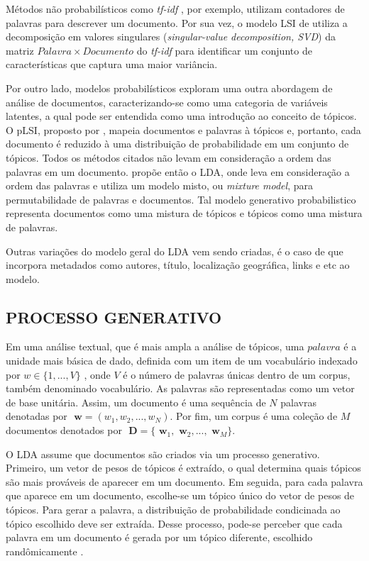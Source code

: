 \documentclass[12pt,a4paper]{article}
\begin{document}
Métodos não probabilísticos como \textit{tf-idf} \cite{salton1983introduction}, por exemplo, utilizam contadores de palavras para descrever um documento.
 Por sua vez, o modelo LSI de  utiliza a decomposição em valores singulares (\textit{singular-value decomposition, SVD}) da
 matriz $Palavra \times Documento$ do \textit{tf-idf} para identificar um conjunto de características que captura uma maior variância.

Por outro lado, modelos probabilísticos exploram uma outra abordagem de análise de documentos, caracterizando-se como uma categoria de variáveis latentes, a qual pode ser entendida como uma introdução ao conceito de tópicos. O pLSI, proposto por , 
 mapeia documentos e palavras à tópicos e, portanto, cada documento é reduzido à uma distribuição de probabilidade em um conjunto de tópicos.
 Todos os métodos citados não levam em consideração a ordem das palavras em um documento.  propõe então o
 LDA, onde leva em consideração a ordem das palavras e utiliza um modelo misto, ou \textit{mixture model}, para permutabilidade de palavras e documentos. Tal
 modelo generativo probabilistico representa documentos como uma mistura de tópicos e tópicos como uma mistura de palavras.

Outras variações do modelo geral do LDA vem sendo criadas, é o caso de 
 que incorpora metadados como autores, título, localização geográfica, links e etc ao modelo.
\subsection{PROCESSO GENERATIVO} \label{sec:processo-generativo}

Em uma análise textual, que é mais ampla a análise de  tópicos, uma $palavra$ é a unidade mais básica de dado, definida com um item de um vocabulário indexado por \(w \in \{1,. . . , V\}\)  , onde $V$ é o número de palavras únicas dentro de um corpus, também denominado vocabulário. As palavras são representadas como um vetor de base unitária. Assim, um documento é uma sequência de $N$ palavras denotadas por \(\textbf{ w} = (w_1, w_2,. . . ,  w_N)\). Por fim, um corpus é uma coleção de $M$ documentos denotados por \(\textbf{ D} = \{\textbf{ w}_1, \textbf{ w}_2, . . ., \textbf{ w}_M\}\).

 O LDA assume que documentos são criados via um processo generativo. Primeiro, um vetor de pesos de tópicos é extraído, o qual determina
 quais tópicos são mais prováveis de aparecer em um documento. Em seguida, para cada palavra que aparece em um documento, escolhe-se um tópico
 único do vetor de pesos de tópicos. Para gerar a palavra, a distribuição de probabilidade condicinada ao tópico escolhido deve ser extraída.
 Desse processo, pode-se perceber que cada palavra em um documento é gerada por um tópico diferente, escolhido randômicamente \cite{hu2009latent}.
\end{document}
